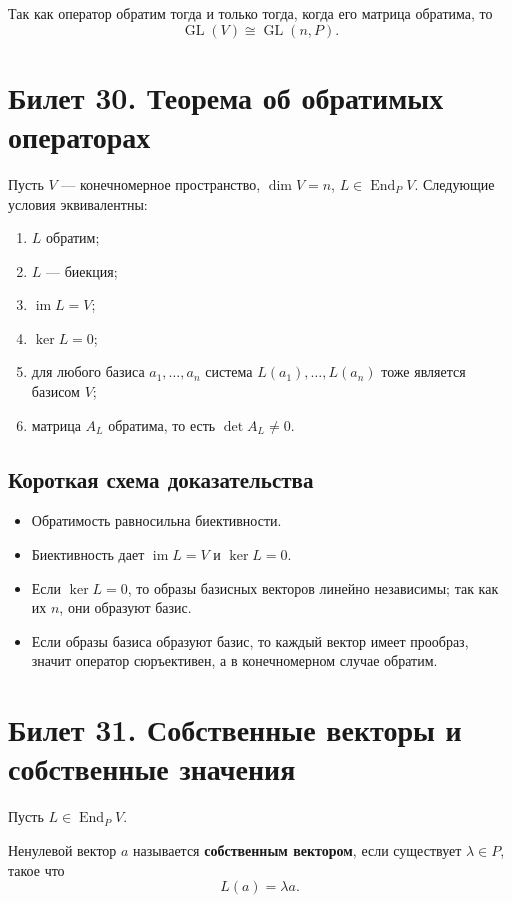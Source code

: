 \documentclass[12pt,a4paper]{article}
\DeclareMathOperator{\End}{End}
\DeclareMathOperator{\Ker}{ker}
\DeclareMathOperator{\Image}{im}
\DeclareMathOperator{\GL}{GL}
\begin{document}
Так как оператор обратим тогда и только тогда, когда его матрица обратима, то
\[
    \GL(V)\cong \GL(n,P).
\]

\section{Билет 30. Теорема об обратимых операторах}

Пусть $V$ --- конечномерное пространство, $\dim V=n$, $L\in\End_P V$. Следующие условия эквивалентны:

\begin{enumerate}
    \item $L$ обратим;
    \item $L$ --- биекция;
    \item $\Image L=V$;
    \item $\Ker L=0$;
    \item для любого базиса $a_1,\ldots,a_n$ система $L(a_1),\ldots,L(a_n)$ тоже является базисом $V$;
    \item матрица $A_L$ обратима, то есть $\det A_L\ne0$.
\end{enumerate}

\subsection*{Короткая схема доказательства}

\begin{itemize}
    \item Обратимость равносильна биективности.
    \item Биективность дает $\Image L=V$ и $\Ker L=0$.
    \item Если $\Ker L=0$, то образы базисных векторов линейно независимы; так как их $n$, они образуют базис.
    \item Если образы базиса образуют базис, то каждый вектор имеет прообраз, значит оператор сюръективен, а в конечномерном случае обратим.
\end{itemize}

\section{Билет 31. Собственные векторы и собственные значения}

Пусть $L\in\End_P V$.

Ненулевой вектор $a$ называется \textbf{собственным вектором}, если существует $\lambda\in P$, такое что
\[
    L(a)=\lambda a.
\]
\end{document}
